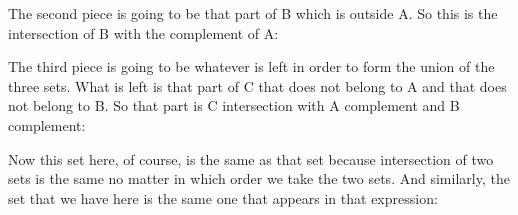 \documentclass[pdftex, brazil, 12pt, twoside]{article}
\begin{document}
The second piece is going to be that part of B which is
outside A. So this is the intersection of B with the
complement of A:

\begin{figure}[H]
  \begin{center}
  \end{center}
\end{figure}

The third piece is going to be whatever is left in order to
form the union of the three sets.
What is left is that part of C that does not belong to A and
that does not belong to B. So that part is C intersection
with A complement and B complement:

\begin{figure}[H]
  \begin{center}
  \end{center}
\end{figure}

Now this set here, of course, is the same as that set
because intersection of two sets is the same no matter in
which order we take the two sets.
And similarly, the set that we have here is the same one that
appears in that expression:

\begin{figure}[H]
  \begin{center}
  \end{center}
\end{figure}
\end{document}
